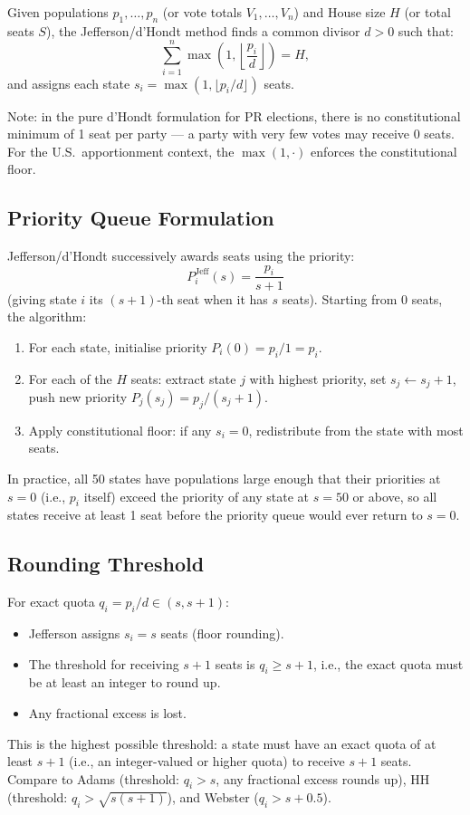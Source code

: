 \label{sec:definition}

\begin{definition}
  Given populations $p_1, \ldots, p_n$ (or vote totals $V_1, \ldots, V_n$)
  and House size $H$ (or total seats $S$), the Jefferson/d'Hondt method
  finds a common divisor $d > 0$ such that:
  \[
    \sum_{i=1}^{n} \max\!\left(1, \left\lfloor \frac{p_i}{d} \right\rfloor\right) = H,
  \]
  and assigns each state $s_i = \max(1, \lfloor p_i/d \rfloor)$ seats.
\end{definition}

\noindent
Note: in the pure d'Hondt formulation for PR elections, there is no
constitutional minimum of 1 seat per party --- a party with very few
votes may receive 0 seats.
For the U.S.\ apportionment context, the $\max(1, \cdot)$ enforces
the constitutional floor.

\subsection{Priority Queue Formulation}

Jefferson/d'Hondt successively awards seats using the priority:
\[
  P_i^{\text{Jeff}}(s) = \frac{p_i}{s+1}
\]
(giving state $i$ its $(s+1)$-th seat when it has $s$ seats).
Starting from 0 seats, the algorithm:
\begin{enumerate}
  \item For each state, initialise priority $P_i(0) = p_i/1 = p_i$.
  \item For each of the $H$ seats:
    extract state $j$ with highest priority, set $s_j \leftarrow s_j+1$,
    push new priority $P_j(s_j) = p_j/(s_j+1)$.
  \item Apply constitutional floor: if any $s_i = 0$, redistribute
    from the state with most seats.
\end{enumerate}
In practice, all 50 states have populations large enough that their
priorities at $s=0$ (i.e., $p_i$ itself) exceed the priority of any
state at $s=50$ or above, so all states receive at least 1 seat
before the priority queue would ever return to $s=0$.

\subsection{Rounding Threshold}

For exact quota $q_i = p_i/d \in (s, s+1)$:
\begin{itemize}
  \item Jefferson assigns $s_i = s$ seats (floor rounding).
  \item The threshold for receiving $s+1$ seats is $q_i \geq s+1$,
    i.e., the exact quota must be at least an integer to round up.
  \item Any fractional excess is lost.
\end{itemize}
This is the highest possible threshold: a state must have an exact quota
of at least $s+1$ (i.e., an integer-valued or higher quota) to receive
$s+1$ seats.
Compare to Adams (threshold: $q_i > s$, any fractional excess rounds up),
HH (threshold: $q_i > \sqrt{s(s+1)}$), and Webster ($q_i > s+0.5$).

